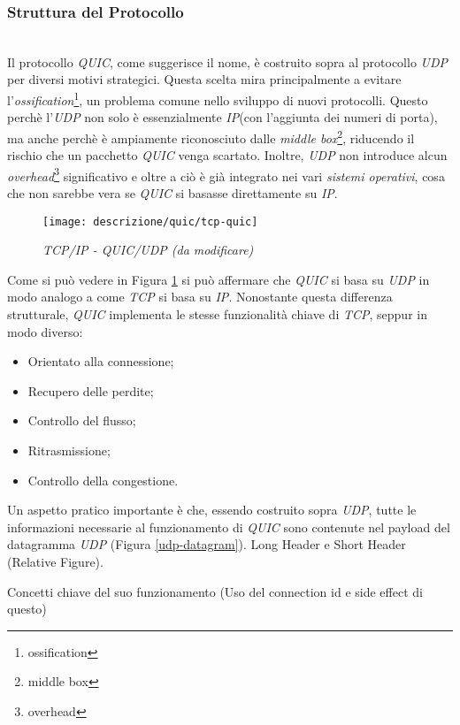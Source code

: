 \subsubsection{Struttura del Protocollo}
~\\ 
\indent Il protocollo \emph{QUIC}, come suggerisce il nome, è costruito sopra al protocollo \emph{UDP} per diversi motivi strategici. Questa scelta mira principalmente a evitare l'\emph{ossification}\footnote{\gls{ossification}}, un problema comune nello sviluppo di nuovi protocolli.
Questo perchè l'\emph{UDP} non solo è essenzialmente \emph{IP}(con l'aggiunta dei numeri di porta), ma anche perchè è ampiamente riconosciuto dalle \emph{middle box}\footnote{\gls{middle box}}, riducendo il rischio che un pacchetto \emph{QUIC} venga scartato.
Inoltre, \emph{UDP} non introduce alcun \emph{overhead}\footnote{\gls{overhead}} significativo e oltre a ciò è già integrato nei vari \emph{sistemi operativi}, cosa che non sarebbe vera se \emph{QUIC} si basasse direttamente su \emph{IP}.
\\
\begin{figure}[!h]
    \centering
    \texttt{[image: descrizione/quic/tcp-quic]}
    \caption{\emph{TCP/IP - QUIC/UDP (da modificare)}}
    \label{tcp-quic}
\end{figure}

\noindent Come si può vedere in Figura \ref{tcp-quic} si può affermare che \emph{QUIC} si basa su \emph{UDP} in modo analogo a come \emph{TCP} si basa su \emph{IP}.
Nonostante questa differenza strutturale, \emph{QUIC} implementa le stesse funzionalità chiave di \emph{TCP}, seppur in modo diverso:
\begin{itemize}
    \item Orientato alla connessione;
    \item Recupero delle perdite;
    \item Controllo del flusso;
    \item Ritrasmissione;
    \item Controllo della congestione.
\end{itemize}

\noindent Un aspetto pratico importante è che, essendo costruito sopra \emph{UDP}, tutte le informazioni necessarie al funzionamento di \emph{QUIC} sono contenute nel payload del datagramma \emph{UDP} (Figura \ref{udp-datagram}).
Long Header e Short Header (Relative Figure).

Concetti chiave del suo funzionamento (Uso del connection id e side effect di questo)


